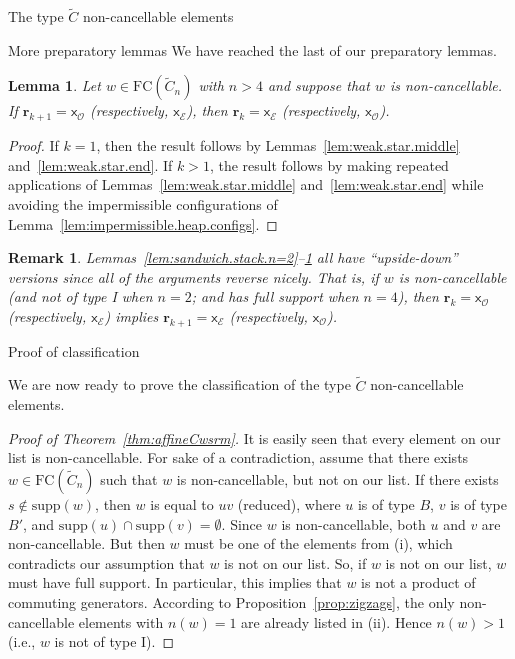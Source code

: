 \documentclass[12pt]{amsart}
\newtheorem{lem}[thm]{Lemma}
\newtheorem{rem}[thm]{Remark}
\newcommand{\C}{\widetilde{C}}
\renewcommand{\O}{\mathcal{O}}
\newcommand{\E}{\mathcal{E}}
\newcommand{\x}{\mathsf{x}}
\newcommand{\supp}{\mathrm{supp}}
\renewcommand{\(}{\left(}
\renewcommand{\)}{\right)}
\newcommand{\FC}{\mathrm{FC}}
\renewcommand{\r}{\mathbf{r}}
\begin{document}
\begin{section}{The type $\C$ non-cancellable elements}
\begin{subsection}{More preparatory lemmas}
We have reached the last of our preparatory lemmas.

\begin{lem}\label{lem:sandwich.stack.n>4}
Let $w \in \FC(\C_{n})$ with $n > 4$ and suppose that $w$ is non-cancellable.  If $\r_{k+1}=\x_{\O}$ (respectively, $\x_{\E}$), then $\r_{k}=\x_{\E}$ (respectively, $\x_{\O}$).
\end{lem}

\begin{proof}
If $k=1$, then the result follows by Lemmas~\ref{lem:weak.star.middle} and~\ref{lem:weak.star.end}.  If $k>1$, the result follows by making repeated applications of Lemmas~\ref{lem:weak.star.middle} and~\ref{lem:weak.star.end} while avoiding the impermissible configurations of Lemma~\ref{lem:impermissible.heap.configs}.
\end{proof}

\begin{rem}
Lemmas~\ref{lem:sandwich.stack.n=2}--\ref{lem:sandwich.stack.n>4} all have ``upside-down'' versions since all of the arguments reverse nicely.  That is, if $w$ is non-cancellable (and not of type I when $n=2$; and has full support when $n=4$), then $\r_{k}=\x_{\O}$ (respectively, $\x_{\E}$) implies $\r_{k+1}=\x_{\E}$ (respectively, $\x_{\O}$).
\end{rem}

\end{subsection}


\begin{subsection}{Proof of classification}

We are now ready to prove the classification of the type $\C$ non-cancellable elements.


\begin{proof}[Proof of Theorem~\ref{thm:affineCwsrm}]
It is easily seen that every element on our list is non-cancellable.  For sake of a contradiction, assume that there exists $w \in \FC(\C_{n})$ such that $w$ is non-cancellable, but not on our list.  If there exists $s \notin \supp(w)$, then $w$ is equal to $uv$ (reduced), where $u$ is of type $B$, $v$ is of type $B'$, and $\supp(u) \cap \supp(v) = \emptyset$.  Since $w$ is non-cancellable, both $u$ and $v$ are non-cancellable.  But then $w$ must be one of the elements from (i), which contradicts our assumption that $w$ is not on our list.  So, if $w$ is not on our list, $w$ must have full support.  In particular, this implies that $w$ is not a product of commuting generators.  According to Proposition~\ref{prop:zigzags}, the only non-cancellable elements with $n(w)=1$ are already listed in (ii).  Hence $n(w)>1$ (i.e., $w$ is not of type I).  


\end{proof}
\end{subsection}
\end{section}
\end{document}
